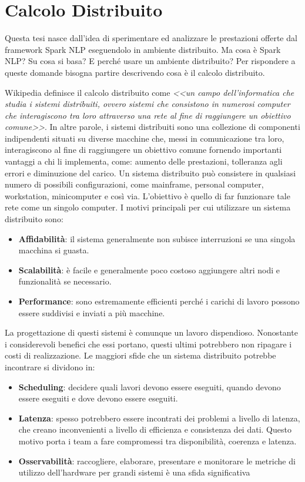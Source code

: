\section{Calcolo Distribuito}
Questa tesi nasce dall'idea di sperimentare ed analizzare le prestazioni offerte dal framework Spark NLP eseguendolo in ambiente distribuito. Ma cosa è Spark NLP? Su cosa si basa? E perché usare un ambiente distribuito? Per rispondere a queste domande bisogna partire descrivendo cosa è il calcolo distribuito.

Wikipedia definisce il calcolo distribuito come \textit{<<un campo dell'informatica che studia i sistemi distribuiti, ovvero sistemi che consistono in numerosi computer che interagiscono tra loro attraverso una rete al fine di raggiungere un obiettivo comune>>}. In altre parole, i sistemi distribuiti sono una collezione di componenti indipendenti situati su diverse macchine che, messi in comunicazione tra loro, interagiscono al fine di raggiungere un obiettivo comune fornendo importanti vantaggi a chi li implementa, come: aumento delle prestazioni, tolleranza agli errori e diminuzione del carico. Un sistema distribuito può consistere in qualsiasi numero di possibili configurazioni, come mainframe, personal computer, workstation, minicomputer e così via. L'obiettivo è quello di far funzionare tale rete come un singolo computer. I motivi principali per cui utilizzare un sistema distribuito sono:
\begin{itemize}
    \item \textbf{Affidabilità}: il sistema generalmente non subisce interruzioni se una singola macchina si guasta.
    \item \textbf{Scalabilità}: è facile e generalmente poco costoso aggiungere altri nodi e funzionalità se necessario.
    \item \textbf{Performance}: sono estremamente efficienti perché i carichi di lavoro possono essere suddivisi e inviati a più macchine.
\end{itemize}
La progettazione di questi sistemi è comunque un lavoro dispendioso. Nonostante i considerevoli benefici che essi portano, questi ultimi potrebbero non ripagare i costi di realizzazione. Le maggiori sfide che un sistema distribuito potrebbe incontrare si dividono in:
\begin{itemize}
    \item \textbf{Scheduling}: decidere quali lavori devono essere eseguiti, quando devono essere eseguiti e dove devono essere eseguiti. 
    \item \textbf{Latenza}: spesso potrebbero essere incontrati dei problemi a livello di latenza, che creano inconvenienti a livello di efficienza e consistenza dei dati. Questo motivo porta i team a fare compromessi tra disponibilità, coerenza e latenza. 
    \item \textbf{Osservabilità}: raccogliere, elaborare, presentare e monitorare le metriche di utilizzo dell'hardware per grandi sistemi è una sfida significativa
\end{itemize}
